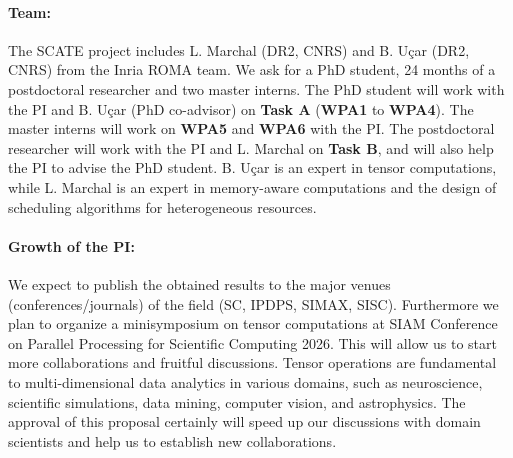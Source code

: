 \documentclass[a4paper,11pt]{article}
\newcommand{\sk}[1]{{\color{blue} \emph{#1}}}
\begin{document}
	\vspace*{-0.25cm}\paragraph{Team:} The SCATE project includes L. Marchal (DR2, CNRS) and B. Uçar (DR2, CNRS) from the Inria ROMA team. We ask for a PhD student, 24 months of a postdoctoral researcher and two master interns. The PhD student will work with the PI and B. Uçar (PhD co-advisor) on \textbf{Task A} (\textbf{WPA1} to \textbf{WPA4}). The master interns will work on \textbf{WPA5} and \textbf{WPA6} with the PI. The postdoctoral researcher will work with the PI and L. Marchal on \textbf{Task B}, and will also help the PI to advise the PhD student. B. Uçar is an expert in tensor computations, while L. Marchal is an expert in memory-aware computations and the design of scheduling algorithms for heterogeneous resources.
	


	
	
	\vspace*{-0.25cm}\paragraph{Growth of the PI:}
	We expect to publish the obtained results to the major venues (conferences/journals) of the field (SC, IPDPS, SIMAX, SISC). Furthermore we plan to organize a minisymposium on tensor computations at SIAM Conference on Parallel Processing for Scientific Computing 2026. This will allow us to start more collaborations and fruitful discussions. Tensor operations are fundamental to multi-dimensional data analytics in various domains, such as neuroscience, scientific simulations, data mining, computer vision, and astrophysics. The approval of this proposal certainly will speed up our discussions with domain scientists and help us to establish new collaborations. 
	
	
	
	
	\vspace*{-0.315cm}
	{\footnotesize
		
		
	}
	

%	
\end{document}

